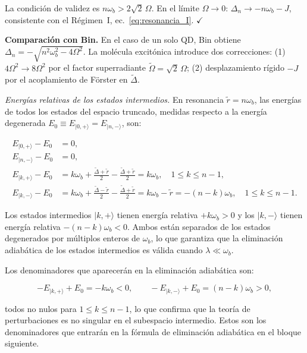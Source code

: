 \documentclass[12pt]{article}
\begin{document}
\noindent
La condición de validez es $n\omega_b > 2\sqrt{2}\,\Omega$.
En el límite $\Omega \to 0$: $\Delta_n \to -n\omega_b - J$,
consistente con el Régimen~I, ec.~\eqref{eq:resonancia_I}. $\checkmark$

\medskip
\noindent
\textbf{Comparación con Bin.}
En el caso de un solo QD, Bin obtiene
$\Delta_n = -\sqrt{n^2\omega_b^2 - 4\Omega^2}$.
La molécula excitónica introduce dos correcciones:
(1) $4\Omega^2 \to 8\Omega^2$ por el factor superradiante
$\widetilde\Omega = \sqrt{2}\,\Omega$; (2) desplazamiento rígido
$-J$ por el acoplamiento de Förster en $\widetilde\Delta$.

\medskip
\noindent
\textit{Energías relativas de los estados intermedios.}
En resonancia $\tilde{r} = n\omega_b$, las energías de todos los
estados del espacio truncado, medidas respecto a la energía degenerada
$E_0 \equiv E_{|0,+\rangle} = E_{|n,-\rangle}$, son:

\begin{align}
	E_{|0,+\rangle} - E_0 &= 0,
	\label{eq:E0p_rel}\\[4pt]
	E_{|n,-\rangle} - E_0 &= 0,
	\label{eq:Enm_rel}\\[4pt]
	E_{|k,+\rangle} - E_0
	&= k\omega_b + \frac{\widetilde\Delta + \tilde{r}}{2}
	- \frac{\widetilde\Delta + \tilde{r}}{2}
	= k\omega_b,
	\quad 1 \leq k \leq n-1,
	\label{eq:Ekp_rel}\\[4pt]
	E_{|k,-\rangle} - E_0
	&= k\omega_b + \frac{\widetilde\Delta - \tilde{r}}{2}
	- \frac{\widetilde\Delta + \tilde{r}}{2}
	= k\omega_b - \tilde{r}
	= -(n-k)\omega_b,
	\quad 1 \leq k \leq n-1.
	\label{eq:Ekm_rel}
\end{align}

\noindent
Los estados intermedios $|k,+\rangle$ tienen energía relativa
$+k\omega_b > 0$ y los $|k,-\rangle$ tienen energía relativa
$-(n-k)\omega_b < 0$. Ambos están separados de los estados
degenerados por múltiplos enteros de $\omega_b$, lo que garantiza
que la eliminación adiabática de los estados intermedios es válida
cuando $\lambda \ll \omega_b$.

\medskip
\noindent
Los denominadores que aparecerán en la eliminación adiabática son:

\begin{equation}
	-E_{|k,+\rangle} + E_0 = -k\omega_b < 0,
	\qquad
	-E_{|k,-\rangle} + E_0 = (n-k)\omega_b > 0,
	\label{eq:denominadores}
\end{equation}

\noindent
todos no nulos para $1 \leq k \leq n-1$, lo que confirma que
la teoría de perturbaciones es no singular en el subespacio
intermedio. Estos son los denominadores que entrarán en la fórmula
de eliminación adiabática en el bloque siguiente.
\end{document}
